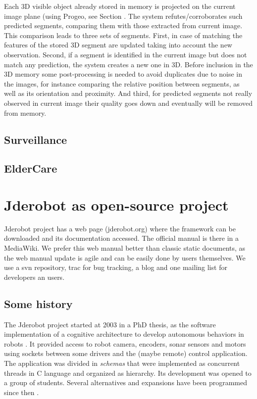 \documentclass[twocolumn]{svjour3}          %
\begin{document}
Each 3D visible object already stored in memory is projected on the current image plane (using Progeo, see Section \label{subsec:progeo}. The system refutes/corroborates such predicted segments, comparing them with those extracted from current image. This comparison leads to three sets of segments. First, in case of matching the features of the stored 3D segment are updated taking into account the new observation. Second, if a segment is identified in the current image but does not match any prediction, the system creates a new one in 3D. Before inclusion in the 3D memory some post-processing is needed to avoid duplicates due to noise in the images, for instance comparing the relative position between segments, as well as its orientation and proximity. And third, for predicted segments not really observed in current image their quality goes down and eventually will be removed from memory.

\subsection{Surveillance}

\subsection{ElderCare}

\section{Jderobot as open-source project}

Jderobot project has a web page (jderobot.org) where the framework can be downloaded and its documentation accessed. The official manual is there in a MediaWiki. We prefer this web manual better than classic static documents, as the web manual update is agile and can be easily done by users themselves. We use a svn repository, trac for bug tracking, a blog and one mailing list for developers an users.

\subsection{Some history}

The Jderobot project started at 2003 in a PhD thesis, as the software implementation of a cognitive architecture to develop autonomous behaviors in robots \cite{canas02,canas05e}. It provided access to robot camera, encoders, sonar sensors and motors using sockets between some drivers and the (maybe remote) control application. The application was divided in \textit{schemas} that were implemented as concurrent threads in C language and organized as hierarchy. Its development was opened to a group of students. Several alternatives and expansions have been programmed since then \cite{canas07,canas07f}. 
\end{document}
